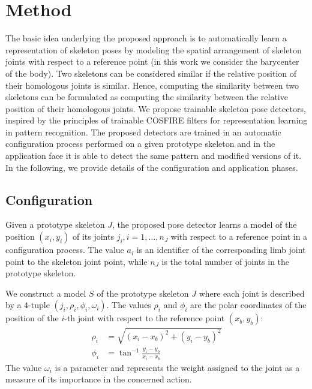 \documentclass[runningheads,a4paper]{llncs}
\begin{document}
\section{Method}
\label{sec:proposed}

The basic idea underlying the proposed approach is to automatically learn a representation of skeleton poses by modeling the spatial arrangement of skeleton joints with respect to a reference point (in this work we consider the barycenter of the body). Two skeletons can be considered similar if the relative position of their homologous joints is similar. 
Hence, computing the similarity between two skeletons can be formulated as computing the similarity between the relative  position of their homologous joints. We propose trainable skeleton pose detectors, inspired by the principles of trainable COSFIRE filters for representation learning in pattern recognition. 
The proposed detectors are trained in an automatic configuration process performed on a given prototype skeleton and in the application face it is able to detect the same pattern and modified versions of it. In the following, we provide details of the configuration and application phases.



\subsection{Configuration}
Given a prototype skeleton $J$, the proposed pose detector learns a model of the position $(x_i,y_i)$  of its joints $j_i, i=1, \dots, n_J$ with respect to a reference point in a configuration process. The value $a_i$ is an identifier of the corresponding limb joint point to the skeleton joint point, while $n_J$ is the total number of joints in the prototype skeleton.

We construct a model $S$ of the prototype skeleton $J$ where each joint is described by  a $4$-tuple $(j_i, \rho_i, \phi_i, \omega_{i})$. The values  $\rho_i$ and $\phi_i$ are the polar coordinates of the position of the $i$-th joint with respect to the reference point $(x_b, y_b)$:
\begin{align}
\rho_i &= \sqrt{(x_i-x_b)^2 + (y_i-y_b)^2}\\
\phi_i &= \tan^{-1} \frac{y_i-y_b}{x_i-x_b}
\end{align}
The value $\omega_i$ is a parameter and represents the weight assigned to the joint as a measure of its importance in the concerned action. 
\end{document}
